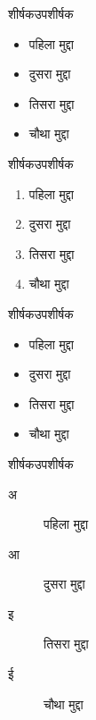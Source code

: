%
%
\maketitle
\begin{frame}{शीर्षक}{उपशीर्षक}
  \begin{itemize}
  \item पहिला मुद्दा
  \item दुसरा मुद्दा
  \item तिसरा मुद्दा
  \item चौथा मुद्दा
  \end{itemize}
\end{frame}
\begin{frame}{शीर्षक}{उपशीर्षक}
  \begin{enumerate}
  \item पहिला मुद्दा
  \item दुसरा मुद्दा
  \item तिसरा मुद्दा
  \item चौथा मुद्दा
  \end{enumerate}
\end{frame}
\begin{frame}{शीर्षक}{उपशीर्षक}
  \begin{itemize}
  \item पहिला मुद्दा
  \item दुसरा मुद्दा
  \item तिसरा मुद्दा
  \item चौथा मुद्दा
  \end{itemize}
\end{frame}
\begin{frame}{शीर्षक}{उपशीर्षक}
  \begin{description}
  \item[अ] पहिला मुद्दा
  \item[आ] दुसरा मुद्दा
  \item[इ] तिसरा मुद्दा
  \item[ई] चौथा मुद्दा
  \end{description}
\end{frame}
